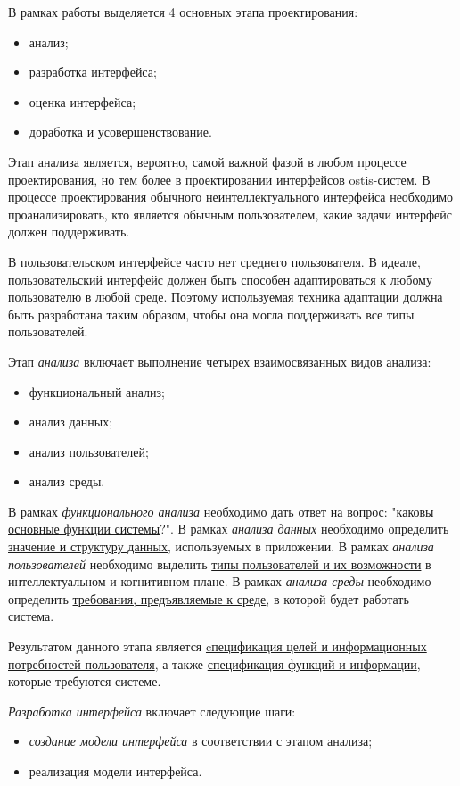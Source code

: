 В рамках работы \cite{Patrick} выделяется 4 основных этапа проектирования:
\begin{itemize}
    \item анализ;
    \item разработка интерфейса;
    \item оценка интерфейса;
    \item доработка и усовершенствование.
\end{itemize}

Этап анализа является, вероятно, самой важной фазой в любом процессе проектирования, но тем более в проектировании интерфейсов ostis-систем. В
процессе проектирования обычного неинтеллектуального интерфейса
необходимо проанализировать, кто является обычным пользователем, какие задачи интерфейс должен поддерживать. 

В пользовательском интерфейсе часто нет среднего пользователя.
В идеале, пользовательский интерфейс должен быть способен адаптироваться к любому пользователю в любой среде. Поэтому используемая техника адаптации должна быть разработана таким образом, чтобы она могла поддерживать все типы пользователей.

Этап \textit{анализа} включает выполнение четырех взаимосвязанных видов анализа:
\begin{itemize}
    \item функциональный анализ;
    \item анализ данных;
    \item анализ пользователей;
    \item анализ среды.
\end{itemize}

В рамках \textit{функционального анализа} необходимо дать ответ на вопрос: "каковы \uline{основные функции системы}?".
В рамках \textit{анализа данных} необходимо определить \uline{значение и структуру данных}, используемых в приложении.
В рамках \textit{анализа пользователей} необходимо выделить \uline{типы пользователей и их возможности} в интеллектуальном
и когнитивном плане.
В рамках \textit{анализа среды} необходимо определить \uline{требования, предъявляемые к среде}, в которой будет работать система.

Результатом данного этапа является \uline{cпецификация целей и информационных потребностей пользователя}, а также
\uline{спецификация функций и информации}, которые требуются системе.

\textit{Разработка интерфейса} включает следующие шаги:
\begin{itemize}
	\item \textit{создание модели интерфейса} в соответствии с этапом анализа;
	\item реализация модели интерфейса.
\end{itemize}

